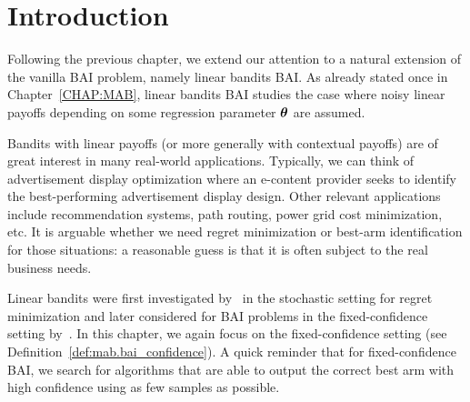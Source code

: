 \section{Introduction}\label{sec:lgc.intro}


Following the previous chapter, we extend our attention to a natural extension of the vanilla BAI problem, namely linear bandits BAI. As already stated once in Chapter~\ref{CHAP:MAB}, linear bandits BAI studies the case where noisy linear payoffs depending on some regression parameter ${\boldsymbol \theta}$ are assumed.

Bandits with linear payoffs (or more generally with contextual payoffs) are of great interest in many real-world applications. Typically, we can think of advertisement display optimization where an e-content provider seeks to identify the best-performing advertisement display design. Other relevant applications include recommendation systems, path routing, power grid cost minimization, etc. It is arguable whether we need regret minimization or best-arm identification for those situations: a reasonable guess is that it is often subject to the real business needs.

Linear bandits were first investigated by~\citet{auer2002linear} in the stochastic setting for regret minimization and later considered for BAI problems in the fixed-confidence setting by~\citet{soare2014linear}. In this chapter, we again focus on the fixed-confidence setting (see Definition~\ref{def:mab.bai_confidence}). A quick reminder that for fixed-confidence BAI, we search for algorithms that are able to output the correct best arm with high confidence using as few samples as possible.


